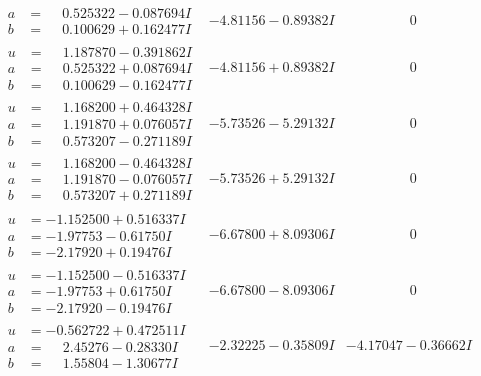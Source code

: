 \documentclass[1p]{elsarticle_modified}
\theoremstyle{definition}
\begin{document}
$$\begin{array}{c|c|c}
\begin{aligned}
a &= \phantom{-}0.525322 - 0.087694 I \\
b &= \phantom{-}0.100629 + 0.162477 I\end{aligned}
 & -4.81156 - 0.89382 I & \phantom{-0.000000 } 0 \\ \hline\begin{aligned}
u &= \phantom{-}1.187870 - 0.391862 I \\
a &= \phantom{-}0.525322 + 0.087694 I \\
b &= \phantom{-}0.100629 - 0.162477 I\end{aligned}
 & -4.81156 + 0.89382 I & \phantom{-0.000000 } 0 \\ \hline\begin{aligned}
u &= \phantom{-}1.168200 + 0.464328 I \\
a &= \phantom{-}1.191870 + 0.076057 I \\
b &= \phantom{-}0.573207 - 0.271189 I\end{aligned}
 & -5.73526 - 5.29132 I & \phantom{-0.000000 } 0 \\ \hline\begin{aligned}
u &= \phantom{-}1.168200 - 0.464328 I \\
a &= \phantom{-}1.191870 - 0.076057 I \\
b &= \phantom{-}0.573207 + 0.271189 I\end{aligned}
 & -5.73526 + 5.29132 I & \phantom{-0.000000 } 0 \\ \hline\begin{aligned}
u &= -1.152500 + 0.516337 I \\
a &= -1.97753 - 0.61750 I \\
b &= -2.17920 + 0.19476 I\end{aligned}
 & -6.67800 + 8.09306 I & \phantom{-0.000000 } 0 \\ \hline\begin{aligned}
u &= -1.152500 - 0.516337 I \\
a &= -1.97753 + 0.61750 I \\
b &= -2.17920 - 0.19476 I\end{aligned}
 & -6.67800 - 8.09306 I & \phantom{-0.000000 } 0 \\ \hline\begin{aligned}
u &= -0.562722 + 0.472511 I \\
a &= \phantom{-}2.45276 - 0.28330 I \\
b &= \phantom{-}1.55804 - 1.30677 I\end{aligned}
 & -2.32225 - 0.35809 I & -4.17047 - 0.36662 I \\ \hline\begin{aligned}

\end{aligned}
\end{array}$$
\end{document}
